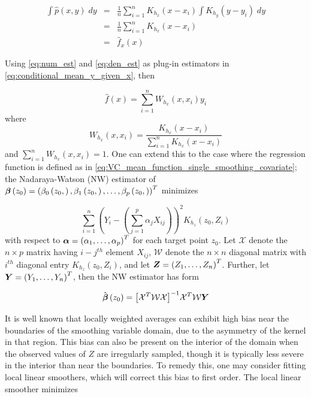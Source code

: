 \documentclass[12pt]{article}
\newcommand{\bfbeta}{\mbox{\boldmath $\beta$}}
\newcommand{\bfalpha}{\mbox{\boldmath $\alpha$}}
\newcommand{\bfY}{\mbox{\boldmath $Y$}}
\newcommand{\bfZ}{\mbox{\boldmath $Z$}}
\begin{document}
\begin{eqnarray}
\int \hat{p}\left(x,y\right)\;dy &=& \frac{1}{n}\sum_{i=1}^{n} K_{h_x}\left(x-x_i\right) \int K_{h_y}\left(y-y_i\right)\;dy \nonumber \\
&=& \frac{1}{n}\sum_{i=1}^{n} K_{h_x}\left(x-x_i\right) \nonumber \\
&=& \hat{f}_x\left(x\right) \label{eq:den_est} 
\end{eqnarray}

Using \ref{eq:num_est} and \ref{eq:den_est} as plug-in estimators in \ref{eq:conditional_mean_y_given_x}, then 

\begin{equation} 
\hat{f}\left(x\right) = \sum_{i=1}^n W_{h_x}\left(x,x_i\right)y_i
\end{equation}
\noindent
where 
\begin{equation} \nonumber
W_{h_x}\left(x,x_i\right) = \frac{K_{h_x}\left(x-x_i\right) }{\sum_{i=1}^{n} K_{h_x}\left(x-x_i\right)}
\end{equation}
\noindent
and $\sum_{i=1}^n W_{h_x}\left(x,x_i\right) = 1$. One can extend this to the case where the regression function is defined as in \ref{eq:VC_mean_function_single_smoothing_covariate}; the Nadaraya-Watson (NW) estimator of $\bfbeta\left(z_0\right) = \left(\beta_0\left(z_0,\right), \beta_1\left(z_0,\right),\dots,\beta_p\left(z_0,\right)\right)^T$ minimizes

\begin{equation} \nonumber 
\sum_{i=1}^n \left(Y_i - \left(\sum_{j=1}^p \alpha_j X_{ij}\right)\right)^2 K_{h_z}\left(z_0,Z_i\right)
\end{equation} 
\noindent
with respect to $\bfalpha = \left( \alpha_1, \dots, \alpha_p\right)^T$ for each target point $z_0$. Let $\mathcal{X}$ denote the $n \times p$ matrix having $i-j^{th}$ element $X_{ij}$, $\mathcal{W}$ denote the $n \times n$ diagonal matrix with $i^{th}$ diagonal entry $K_{h_z}\left(z_0, Z_i\right)$, and let $\bfZ = \left(Z_1, \dots, Z_n\right)^T$. Further, let $\bfY = \left(Y_1, \dots, Y_n\right)^T$, then the NW estimator has form

\begin{equation} \nonumber
\hat{\bfbeta}\left(z_0\right) = \big[\mathcal{X}^T\mathcal{W}\mathcal{X}\big]^{-1} \mathcal{X}^T\mathcal{W} \bfY
\end{equation} 


It is well known that locally weighted averages can exhibit high bias near the boundaries of the smoothing variable domain, due to the asymmetry of the kernel in that region. This bias can also be present on the interior of the domain when the observed values of $Z$ are irregularly sampled, though it is typically less severe in the interior than near the boundaries. To remedy this, one may consider fitting local linear smoothers, which will correct this bias to first order. The local linear smoother minimizes 
\end{document}
